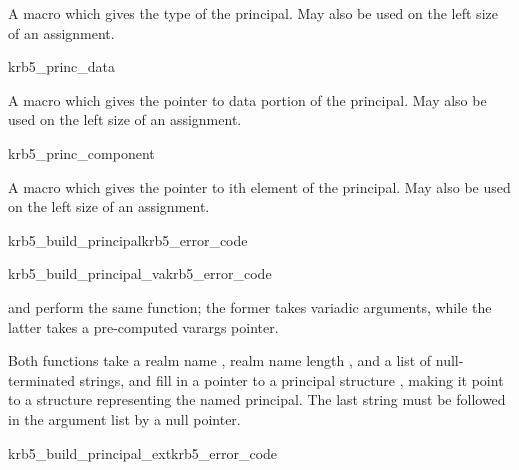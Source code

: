 \internalfunc

A macro which gives the type of the principal.
May also be used on the left size of an assignment.

\begin{funcdecl}{krb5_princ_data}{}
\end{funcdecl}

\internalfunc

A macro which gives the pointer to data portion of the principal.
May also be used on the left size of an assignment.


\begin{funcdecl}{krb5_princ_component}{}
\end{funcdecl}

\internalfunc

A macro which gives the pointer to ith element of the principal.
May also be used on the left size of an assignment.

\begin{funcdecl}{krb5_build_principal}{krb5_error_code}{\funcinout}
\funcout
{}
\funcin
{}
\end{funcdecl}
\begin{funcdecl}{krb5_build_principal_va}{krb5_error_code}{\funcinout}
\funcout
{}
\funcin
{}
\end{funcdecl}

\begin{sloppypar}
 and
perform the same function; the former takes variadic arguments, while
the latter takes a pre-computed varargs pointer.
\end{sloppypar}

Both functions take a realm name , realm name length
, and a list of null-terminated strings, and fill in a
pointer to a principal structure , making it point to a
structure representing the named principal.
The last string must be followed in the argument list by a null pointer.


\begin{funcdecl}{krb5_build_principal_ext}{krb5_error_code}{\funcinout}
\funcout
{}
\funcin
{}
\end{funcdecl}

